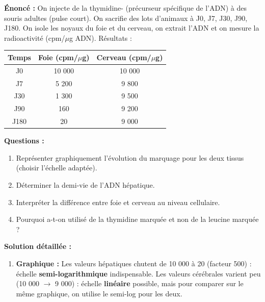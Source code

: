 \documentclass[11pt]{article}
\begin{document}
\begin{exoresolu}
\textbf{Énoncé :} On injecte de la thymidine- (précurseur spécifique de l'ADN) à des souris adultes (pulse court). On sacrifie des lots d'animaux à J0, J7, J30, J90, J180. On isole les noyaux du foie et du cerveau, on extrait l'ADN et on mesure la radioactivité (cpm/$\mu$g ADN). Résultats :

\begin{center}
\begin{tabular}{|c|c|c|}\hline
\rowcolor{popblueL}
\textbf{Temps} & \textbf{Foie (cpm/$\mu$g)} & \textbf{Cerveau (cpm/$\mu$g)} \\ \hline
J0 & 10 000 & 10 000 \\ \hline
J7 & 5 200 & 9 800 \\ \hline
J30 & 1 300 & 9 500 \\ \hline
J90 & 160 & 9 200 \\ \hline
J180 & 20 & 9 000 \\ \hline
\end{tabular}
\end{center}

\textbf{Questions :}
\begin{enumerate}
    \item Représenter graphiquement l'évolution du marquage pour les deux tissus (choisir l'échelle adaptée).
    \item Déterminer la demi-vie de l'ADN hépatique.
    \item Interpréter la différence entre foie et cerveau au niveau cellulaire.
    \item Pourquoi a-t-on utilisé de la thymidine marquée et non de la leucine marquée ?
\end{enumerate}

\tcblower

\textbf{Solution détaillée :}

\begin{enumerate}
    \item \textbf{Graphique :} Les valeurs hépatiques chutent de 10 000 à 20 (facteur 500) : échelle \textbf{semi-logarithmique} indispensable. Les valeurs cérébrales varient peu (10 000 $\to$ 9 000) : échelle \textbf{linéaire} possible, mais pour comparer sur le même graphique, on utilise le semi-log pour les deux.
    \begin{center}
    \end{center}


\end{enumerate}
\end{exoresolu}
\end{document}
